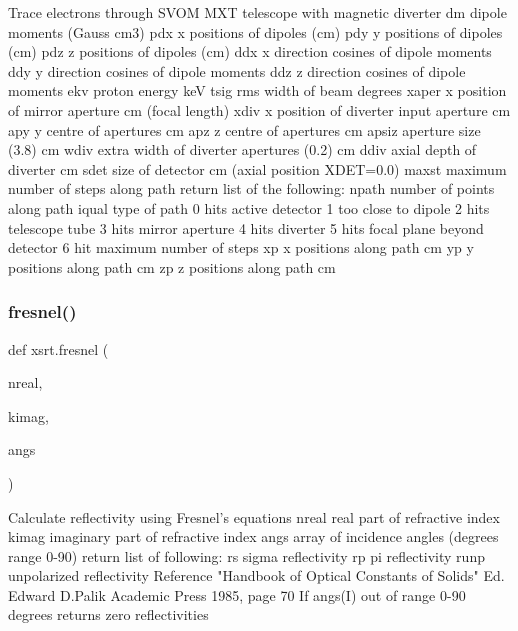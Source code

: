 \begin{DoxyVerb}Trace electrons through SVOM MXT telescope with magnetic diverter
    dm     dipole moments (Gauss cm3)
    pdx    x positions of dipoles (cm)
    pdy    y positions of dipoles (cm)
    pdz    z positions of dipoles (cm)
    ddx    x direction cosines of dipole moments
    ddy    y direction cosines of dipole moments
    ddz    z direction cosines of dipole moments
    ekv    proton energy keV
    tsig   rms width of beam degrees
    xaper  x position of mirror aperture cm (focal length)
    xdiv   x position of diverter input aperture cm
    apy    y centre of apertures cm
    apz    z centre of apertures cm
    apsiz  aperture size (3.8) cm
    wdiv   extra width of diverter apertures (0.2) cm
    ddiv   axial depth of diverter cm
    sdet   size of detector cm (axial position XDET=0.0)
    maxst  maximum number of steps along path
return list of the following:
    npath  number of points along path
    iqual  type of path
            0 hits active detector
            1 too close to dipole
            2 hits telescope tube
            3 hits mirror aperture
            4 hits diverter
            5 hits focal plane beyond detector
            6 hit maximum number of steps
    xp      x positions along path cm
    yp      y positions along path cm
    zp      z positions along path cm
\end{DoxyVerb}
 \mbox{\label{namespacexsrt_aacf1ff781a47cf97a67df9baf0238661}} 
\subsubsection{\texorpdfstring{fresnel()}{fresnel()}}
{\footnotesize\ttfamily def xsrt.\+fresnel (\begin{DoxyParamCaption}\item[{}]{nreal,  }\item[{}]{kimag,  }\item[{}]{angs }\end{DoxyParamCaption})}

\begin{DoxyVerb}Calculate reflectivity using Fresnel's equations
    nreal       real part of refractive index
    kimag       imaginary part of refractive index
    angs        array of incidence angles (degrees range 0-90)
return list of following:
    rs          sigma reflectivity
    rp          pi reflectivity
    runp        unpolarized reflectivity
Reference "Handbook of Optical Constants of Solids" Ed. Edward D.Palik
Academic Press 1985, page 70
If angs(I) out of range 0-90 degrees returns zero reflectivities
\end{DoxyVerb}
 \mbox{\label{namespacexsrt_ad0ebdb12a4c5dca8c024ab22e44d9caf}} 
